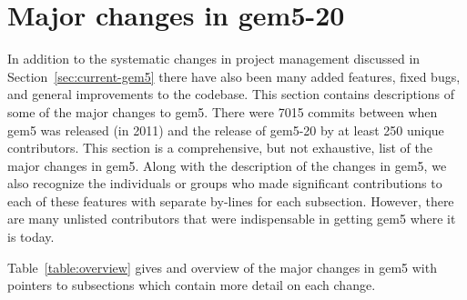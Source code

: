 \section{Major changes in gem5-20}
\label{sec:changes}

In addition to the systematic changes in project management discussed in Section~\ref{sec:current-gem5} there have also been many added features, fixed bugs, and general improvements to the codebase.
This section contains descriptions of some of the major changes to gem5.
There were 7015 commits between when gem5 was released (in 2011) and the release of gem5-20 by at least 250 unique contributors.
This section is a comprehensive, but not exhaustive, list of the major changes in gem5.
Along with the description of the changes in gem5, we also recognize the individuals or groups who made significant contributions to each of these features with separate by-lines for each subsection.
However, there are many unlisted contributors that were indispensable in getting gem5 where it is today.

Table~\ref{table:overview} gives and overview of the major changes in gem5 with pointers to subsections which contain more detail on each change.

